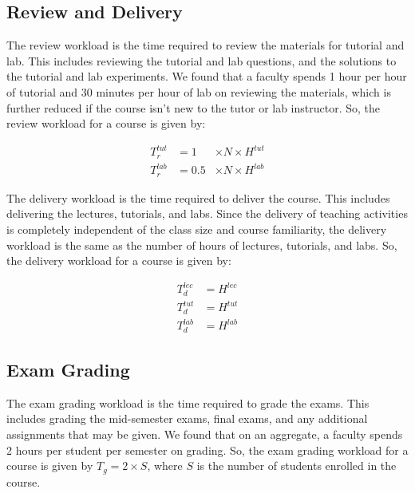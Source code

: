 \subsection{Review and Delivery}

The review workload is the time required to review the materials for tutorial and lab. This includes reviewing the tutorial and lab questions, and the solutions to the tutorial and lab experiments. We found that a faculty spends 1 hour per hour of tutorial and 30 minutes per hour of lab on reviewing the materials, which is further reduced if the course isn't new to the tutor or lab instructor. So, the review workload for a course is given by:

\begin{equation}
  \label{eqn:review-workload}
  \begin{aligned}
    T_r^{tut} & = 1   & \times N \times H^{tut} \\
    T_r^{lab} & = 0.5 & \times N \times H^{lab}
  \end{aligned}
\end{equation}

The delivery workload is the time required to deliver the course. This includes delivering the lectures, tutorials, and labs. Since the delivery of teaching activities is completely independent of the class size and course familiarity, the delivery workload is the same as the number of hours of lectures, tutorials, and labs. So, the delivery workload for a course is given by:

\begin{equation}
  \label{eqn:delivery-workload}
  \begin{aligned}
    T_d^{lec} & = H^{lec} \\
    T_d^{tut} & = H^{tut} \\
    T_d^{lab} & = H^{lab}
  \end{aligned}
\end{equation}


\subsection{Exam Grading}

The exam grading workload is the time required to grade the exams. This includes grading the mid-semester exams, final exams, and any additional assignments that may be given. We found that on an aggregate, a faculty spends 2 hours per student per semester on grading. So, the exam grading workload for a course is given by \(T_g = 2 \times S\), where \(S\) is the number of students enrolled in the course.

